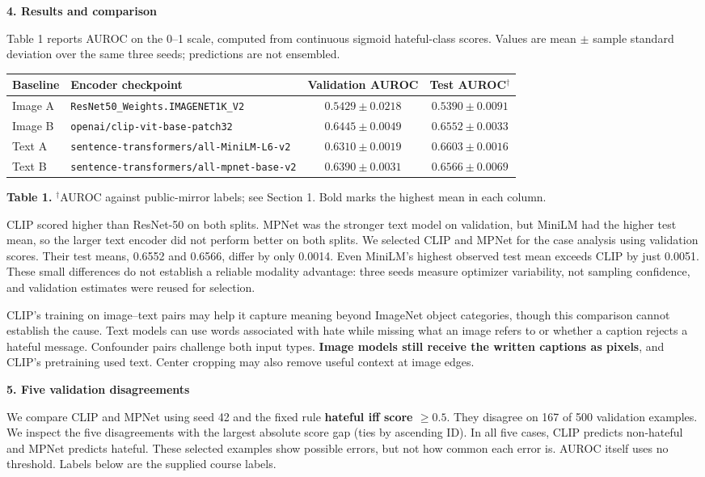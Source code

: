 \documentclass[10pt,a4paper]{article}
\newcommand{\sect}[1]{\vspace{5pt}\textbf{#1}\par\vspace{1pt}}
\newcommand{\model}[1]{\texttt{#1}}
\begin{document}
\newpage
\sect{4. Results and comparison}
Table 1 reports AUROC on the 0--1 scale, computed from continuous sigmoid
hateful-class scores. Values are mean $\pm$ sample standard deviation over the
same three seeds; predictions are not ensembled.

\begin{tabularx}{\linewidth}{@{}lYcc@{}}
\toprule
Baseline & Encoder checkpoint & Validation AUROC & Test AUROC$^\dagger$\\
\midrule
Image A & \model{ResNet50\_Weights.IMAGENET1K\_V2} & $0.5429\pm0.0218$ & $0.5390\pm0.0091$\\
Image B & \model{openai/clip-vit-base-patch32} & $\mathbf{0.6445}\pm0.0049$ & $0.6552\pm0.0033$\\
Text A & \model{sentence-transformers/all-MiniLM-L6-v2} & $0.6310\pm0.0019$ & $\mathbf{0.6603}\pm0.0016$\\
Text B & \model{sentence-transformers/all-mpnet-base-v2} & $0.6390\pm0.0031$ & $0.6566\pm0.0069$\\
\bottomrule
\end{tabularx}
{\footnotesize\textbf{Table 1.} $^\dagger$AUROC against public-mirror labels; see Section 1.
Bold marks the highest mean in each column.}

CLIP scored higher than ResNet-50 on both splits. MPNet was the stronger text
model on validation, but MiniLM had the higher test mean, so the larger text encoder
did not perform better on both splits. We selected CLIP and MPNet for the case
analysis using validation scores.
Their test means, 0.6552 and 0.6566, differ by only 0.0014. Even MiniLM's highest
observed test mean exceeds CLIP by just 0.0051. These small differences do not
establish a reliable modality advantage: three seeds measure optimizer variability,
not sampling confidence, and validation estimates were reused for selection.

CLIP's training on image--text pairs may help it capture meaning beyond ImageNet
object categories, though this comparison cannot establish the cause. Text models
can use words associated with hate while missing what an image refers to or whether
a caption rejects a hateful message. Confounder pairs challenge both input types.
\textbf{Image models still receive the written captions as pixels}, and CLIP's
pretraining used text. Center cropping may also remove useful context at image edges.

\sect{5. Five validation disagreements}
We compare CLIP and MPNet using seed 42 and the fixed rule
\textbf{hateful iff score $\geq0.5$}. They disagree on 167 of 500 validation
examples. We inspect the five disagreements with the largest absolute score
gap (ties by ascending ID). In all five cases, CLIP predicts non-hateful and MPNet predicts hateful.
These selected examples show possible errors, but not how common each error is.
AUROC itself uses no threshold. Labels below are the supplied course labels.
\end{document}
